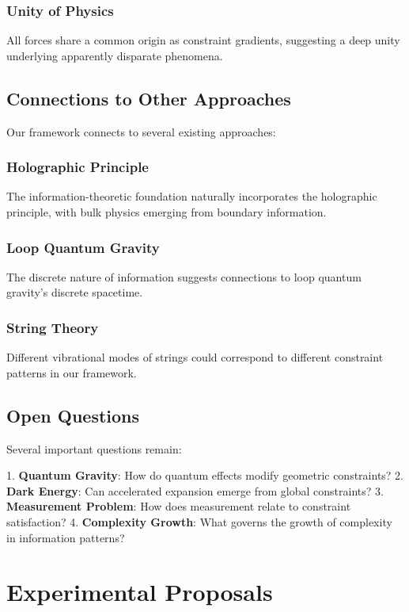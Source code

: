 \documentclass[11pt,a4paper]{article}
\begin{document}
\subsubsection{Unity of Physics}
All forces share a common origin as constraint gradients, suggesting a deep unity underlying apparently disparate phenomena.

\subsection{Connections to Other Approaches}

Our framework connects to several existing approaches:

\subsubsection{Holographic Principle}
The information-theoretic foundation naturally incorporates the holographic principle, with bulk physics emerging from boundary information.

\subsubsection{Loop Quantum Gravity}
The discrete nature of information suggests connections to loop quantum gravity's discrete spacetime.

\subsubsection{String Theory}
Different vibrational modes of strings could correspond to different constraint patterns in our framework.

\subsection{Open Questions}

Several important questions remain:

1. \textbf{Quantum Gravity}: How do quantum effects modify geometric constraints?
2. \textbf{Dark Energy}: Can accelerated expansion emerge from global constraints?
3. \textbf{Measurement Problem}: How does measurement relate to constraint satisfaction?
4. \textbf{Complexity Growth}: What governs the growth of complexity in information patterns?

\section{Experimental Proposals}
\end{document}
